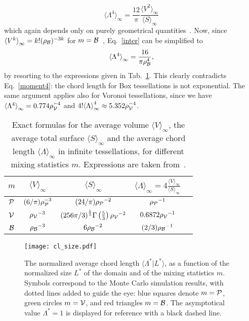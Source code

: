 \documentclass[final,authoryear,5p,times,twocolumn]{elsarticle}
\begin{document}
\begin{equation}
{\langle \Lambda^4 \rangle}_{\infty} = \dfrac{12}{\pi} \dfrac{{\langle V^2 \rangle}_{\infty}}{{\langle S \rangle}_{\infty}}
\label{inter}
\end{equation}
which again depends only on purely geometrical quantities~\cite{miles1972}. Now, since ${\langle V^k \rangle}_{\infty}=k!(\rho_{\cal B})^{-3k}$ for $m={\cal B}$~\cite{miles1972}, Eq.~\ref{inter} can be simplified to
\begin{equation}
{\langle \Lambda^4 \rangle}_{\infty} = \dfrac{16}{\pi \rho_{\cal B}^{4}},
\end{equation}
by resorting to the expressions given in Tab.~\ref{tab_theory}. This clearly contradicts Eq.~\ref{moment4}: the chord length for Box tessellations is not exponential. The same argument applies also for Voronoi tessellations, since we have ${\langle \Lambda^4 \rangle}_{\infty}=0.774 \rho_{\cal V}^{-4}$ and $4!{\langle \Lambda \rangle}^4_\infty \approx 5.352 \rho_{\cal V}^{-4}$.

\begin{table}[t]
\begin{center}
\begin{tabular}{ccccc}
\toprule
$m$ & ${\langle V \rangle}_{\infty}$ & ${\langle S \rangle}_{\infty}$ & ${\langle \Lambda \rangle}_{\infty} = 4 \frac{{\langle V \rangle}_{\infty}}{{\langle S \rangle}_{\infty}} $\\
 \midrule
${\cal P}$  & $(6/\pi)\rho_{\cal P}^{-3}$ & $(24/\pi){\rho_{\cal P}}^{-2}$ & ${\rho_{\cal P}}^{-1}$ \\
${\cal V}$ & ${\rho_{\cal V}}^{-3}$ & ${(256\pi/3)}^{\frac{1}{3}} \Gamma \left(\frac{5}{3}\right){\rho_{\cal V}}^{-2}$ & $0.6872{\rho_{\cal V}}^{-1}$ \\
${\cal B}$ & ${\rho_{\cal B}}^{-3}$ & $6{\rho_{\cal B}}^{-2}$ & $(2/3){\rho_{\cal B}}^{-1}$ \\
\bottomrule
\end{tabular}
\end{center}
\caption{Exact formulas for the average volume ${\langle V \rangle}_{\infty}$, the average total surface ${\langle S \rangle}_{\infty}$ and the average chord length ${\langle \Lambda \rangle}_{\infty}$ in infinite tessellations, for different mixing statistics $m$. Expressions are taken from~\cite{santalo, miles1972}.}
\label{tab_theory}
\end{table}

\begin{figure}[t]
\begin{center}
\texttt{[image: cl\_size.pdf]}
\end{center}
\caption{The normalized average chord length $\langle \Lambda^* | L^*\rangle$, as a function of the normalized size $L^*$ of the domain and of the mixing statistics $m$. Symbols correspond to the Monte Carlo simulation results, with dotted lines added to guide the eye: blue squares denote $m={\cal P}$, green circles $m={\cal V}$, and red triangles $m={\cal B}$. The asymptotical value $\Lambda^*=1$ is displayed for reference with a black dashed line.}
\label{cl_size}
\end{figure}
\end{document}
